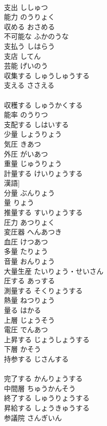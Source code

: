 \documentclass[8pt]{extreport}
\begin{document}
\begin{CJK}{UTF8}{min}
\\	支出	ししゅつ	
\\	能力	のうりょく	
\\	収める	おさめる	
\\	不可能な	ふかのうな	
\\	支払う	しはらう	
\\	支店	してん	
\\	芸能	げいのう	
\\	収集する	しゅうしゅうする	
\\	支える	ささえる	
\\	[和語]
\\	収穫する	しゅうかくする	
\\	能率	のうりつ	
\\	支配する	しはいする	
\\	少量	しょうりょう	
\\	気圧	きあつ	
\\	外圧	がいあつ	
\\	重量	じゅうりょう	
\\	計量する	けいりょうする	
\\	漢語]
\\	分量	ぶんりょう	
\\	量	りょう	
\\	推量する	すいりょうする	
\\	圧力	あつりょく	
\\	変圧器	へんあつき	
\\	血圧	けつあつ	
\\	多量	たりょう	
\\	音量	おんりょう	
\\	大量生産	たいりょう・せいさん	
\\	圧する	あっする	
\\	測量する	そくりょうする	
\\	熱量	ねつりょう	
\\	量る	はかる	
\\	上層	じょうそう	
\\	電圧	でんあつ	
\\	上昇する	じょうしょうする	
\\	下層	かそう	
\\	持参する	じさんする	
\\	[漢語]
\\	完了する	かんりょうする	
\\	中間層	ちゅうかんそう	
\\	終了する	しゅうりょうする	
\\	昇給する	しょうきゅうする	
\\	参議院	さんぎいん	

\end{CJK}
\end{document}
